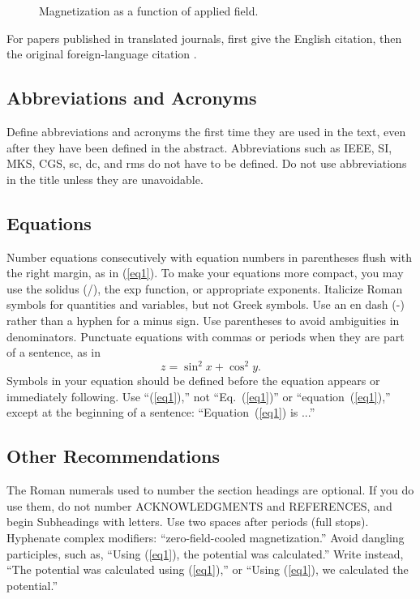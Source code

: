 \begin{figure}[t]
 \centering
\caption{Magnetization as a function of applied field.} \label{figure1}
\end{figure}

For papers published in translated journals, first give the English
citation, then the original foreign-language citation \cite{yorozu}.


\subsection{Abbreviations and Acronyms}

Define abbreviations and acronyms the first time they are used in the
text, even after they have been defined in the abstract. Abbreviations
such as IEEE, SI, MKS, CGS, sc, dc, and rms do not have to be defined. Do
not use abbreviations in the title unless they are unavoidable.

\subsection{Equations}

Number equations consecutively with equation numbers in
parentheses flush with the right margin, as in (\ref{eq1}). To
make your equations more compact, you may use the solidus (/), the
exp function, or appropriate exponents. Italicize Roman symbols
for quantities and variables, but not Greek symbols. Use an en
dash (-) rather than a hyphen for a minus sign. Use parentheses to
avoid ambiguities in denominators. Punctuate equations with commas
or periods when they are part of a sentence, as in
\begin{equation}
 z = \sin^2 x + \cos^2 y.  \label{eq1}
\end{equation}
Symbols in your equation should be defined before the equation
appears or immediately following. Use ``(\ref{eq1}),'' not
``Eq.~(\ref{eq1})'' or ``equation~(\ref{eq1}),'' except at the
beginning of a sentence: ``Equation~(\ref{eq1}) is ...''


\subsection{Other Recommendations}

The Roman numerals used to number the section headings are
optional. If you do use them, do not number ACKNOWLEDGMENTS and
REFERENCES, and begin Subheadings with letters. Use two spaces
after periods (full stops). Hyphenate complex modifiers:
``zero-field-cooled magnetization.'' Avoid dangling participles,
such as, ``Using (\ref{eq1}), the potential was calculated.''
Write instead, ``The potential was calculated using (\ref{eq1}),''
or ``Using  (\ref{eq1}), we calculated the potential.''

